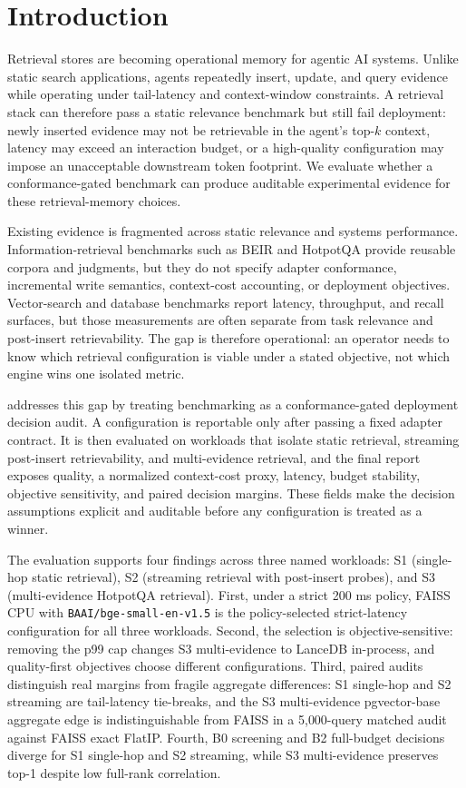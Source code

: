 \section{Introduction}

Retrieval stores are becoming operational memory for agentic AI systems. Unlike static search applications, agents repeatedly insert, update, and query evidence while operating under tail-latency and context-window constraints. A retrieval stack can therefore pass a static relevance benchmark but still fail deployment: newly inserted evidence may not be retrievable in the agent's top-$k$ context, \maxrowp latency may exceed an interaction budget, or a high-quality configuration may impose an unacceptable downstream token footprint. We evaluate whether a conformance-gated benchmark can produce auditable experimental evidence for these retrieval-memory choices.

Existing evidence is fragmented across static relevance and systems performance. Information-retrieval benchmarks such as BEIR \citep{thakur2021beir} and HotpotQA \citep{yang2018hotpotqa} provide reusable corpora and judgments, but they do not specify adapter conformance, incremental write semantics, context-cost accounting, or deployment objectives. Vector-search and database benchmarks report latency, throughput, and recall surfaces, but those measurements are often separate from task relevance and post-insert retrievability. The gap is therefore operational: an operator needs to know which retrieval configuration is viable under a stated objective, not which engine wins one isolated metric.

\sys addresses this gap by treating benchmarking as a conformance-gated deployment decision audit. A configuration is reportable only after passing a fixed adapter contract. It is then evaluated on workloads that isolate static retrieval, streaming post-insert retrievability, and multi-evidence retrieval, and the final report exposes quality, a normalized context-cost proxy, \maxrowp latency, budget stability, objective sensitivity, and paired decision margins. These fields make the decision assumptions explicit and auditable before any configuration is treated as a winner.

The evaluation supports four findings across three named workloads: S1 (single-hop static retrieval), S2 (streaming retrieval with post-insert probes), and S3 (multi-evidence HotpotQA retrieval). First, under a strict 200 ms \maxrowp policy, FAISS CPU with \texttt{BAAI/bge-small-en-v1.5} is the policy-selected strict-latency configuration for all three workloads. Second, the selection is objective-sensitive: removing the p99 cap changes S3 multi-evidence to LanceDB in-process, and quality-first objectives choose different configurations. Third, paired audits distinguish real margins from fragile aggregate differences: S1 single-hop and S2 streaming are tail-latency tie-breaks, and the S3 multi-evidence pgvector-base aggregate edge is indistinguishable from FAISS in a 5{,}000-query matched audit against FAISS exact FlatIP. Fourth, B0 screening and B2 full-budget decisions diverge for S1 single-hop and S2 streaming, while S3 multi-evidence preserves top-1 despite low full-rank correlation.

